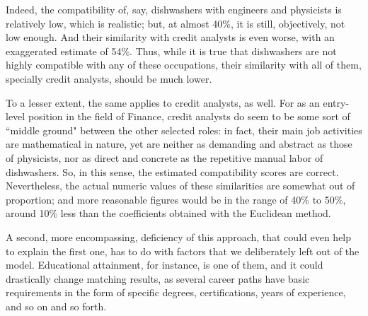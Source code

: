 \documentclass{article}
\begin{document}
Indeed, the compatibility of, say, dishwashers with engineers and physicists is
relatively low, which is realistic; but, at almost 40\%, it is still,
objectively, not low enough. And their similarity with credit analysts is even
worse, with an exaggerated estimate of 54\%. Thus, while it is true that
dishwashers are not highly compatible with any of these occupations, their
similarity with all of them, specially credit analysts, should be much lower.

To a lesser extent, the same applies to credit analysts, as well. For as an
entry-level position in the field of Finance, credit analysts do seem to be
some sort of ``middle ground" between the other selected roles: in fact, their
main job activities are mathematical in nature, yet are neither as demanding
and abstract as those of physicists, nor as direct and concrete as the
repetitive manual labor of dishwashers. So, in this sense, the estimated
compatibility scores are correct. Nevertheless, the actual numeric values of
these similarities are somewhat out of proportion; and more reasonable figures
would be in the range of 40\% to 50\%, around 10\% less than the coefficients
obtained with the Euclidean method.


A second, more encompassing, deficiency of this approach, that could even help
to explain the first one, has to do with factors that we deliberately left out
of the model. Educational attainment, for instance, is one of them, and it
could drastically change matching results, as several career paths have basic
requirements in the form of specific degrees, certifications, years of
experience, and so on and so forth.
\end{document}

